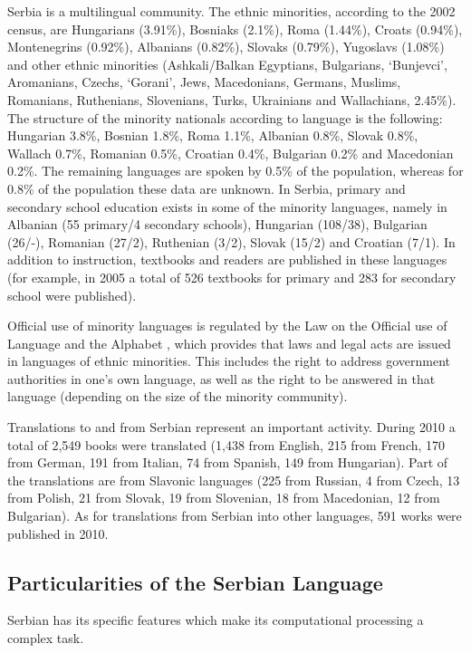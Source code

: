 \begin{multicols}{2}
Serbia is a multilingual community. The ethnic minorities, \cite{Ombudsman} according to the 2002 census, are Hungarians (3.91\%), Bosniaks (2.1\%), Roma (1.44\%), Croats (0.94\%), Montenegrins (0.92\%), Albanians (0.82\%), Slovaks (0.79\%), Yugoslavs (1.08\%) and other ethnic minorities (Ashkali/Balkan Egyptians, Bulgarians, ‘Bunjevci’, Aromanians, Czechs, ‘Gorani’, Jews, Macedonians, Germans, Muslims, Romanians, Ruthenians, Slovenians, Turks, Ukrainians and Wallachians, 2.45\%).  The structure of the minority nationals according to language is the following: Hungarian 3.8\%,  Bosnian 1.8\%,  Roma 1.1\%,  Albanian 0.8\%,  Slovak 0.8\%, Wallach 0.7\%, Romanian 0.5\%,  Croatian 0.4\%,  Bulgarian 0.2\% and Macedonian 0.2\%.  The remaining languages are spoken by 0.5\% of the population, whereas for 0.8\% of the population these data are unknown. In Serbia, primary and secondary school education exists in some of the minority languages, namely in Albanian (55 primary/4 secondary schools), Hungarian (108/38), Bulgarian (26/-), Romanian (27/2), Ruthenian (3/2), Slovak (15/2) and Croatian (7/1). \cite{GOD2010} In addition to instruction, textbooks and readers are published in these languages (for example, in 2005 a total of 526 textbooks for primary and 283 for secondary school were published). \cite{HDR} 

Official use of minority languages is regulated by the Law on the Official use of Language and the Alphabet \cite{SGRS},  which provides that laws and legal acts are issued in languages of ethnic minorities. This includes the right to address government authorities in one’s own language, as well as the right to be answered in that language (depending on the size of the minority community).

Translations to and from Serbian represent an important activity. During 2010 a total of 2,549 books were translated (1,438 from English, 215 from French, 170 from German, 191 from Italian, 74 from Spanish, 149 from Hungarian). Part of the translations are from Slavonic languages (225 from Russian, 4 from Czech, 13 from Polish, 21 from Slovak, 19 from Slovenian, 18 from Macedonian, 12 from Bulgarian). As for translations from Serbian into other languages, 591 works were published in 2010. 

\subsection{Particularities of the Serbian Language}

Serbian has its specific features which make its computational processing a complex task. 


\end{multicols}
